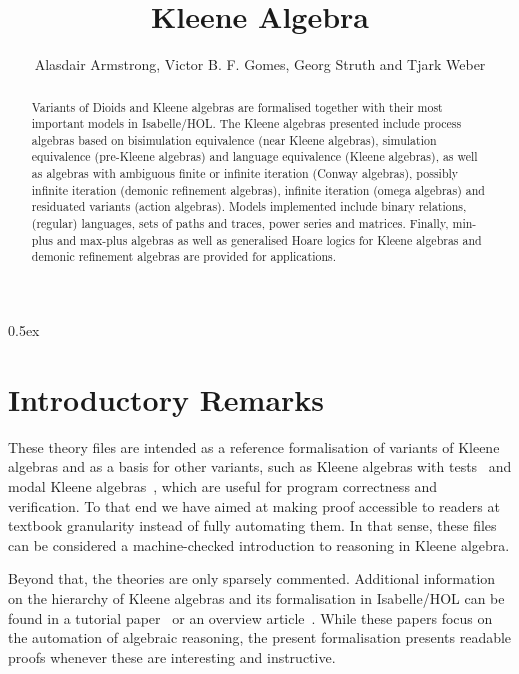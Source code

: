 \documentclass[11pt,a4paper]{article}
\begin{document}
\title{Kleene Algebra}
\author{Alasdair Armstrong, Victor B. F. Gomes, Georg Struth and Tjark Weber}

\maketitle

\begin{abstract}
  Variants of Dioids and Kleene algebras are formalised together with
  their most important models in Isabelle/HOL.  The Kleene algebras
  presented include process algebras based on bisimulation equivalence
  (near Kleene algebras), simulation equivalence (pre-Kleene algebras)
  and language equivalence (Kleene algebras), as well as algebras with
  ambiguous finite or infinite iteration (Conway algebras), possibly
  infinite iteration (demonic refinement algebras), infinite iteration
  (omega algebras) and residuated variants (action algebras).  Models
  implemented include binary relations, (regular) languages, sets of
  paths and traces, power series and matrices.  Finally, min-plus and
  max-plus algebras as well as generalised Hoare logics for Kleene
  algebras and demonic refinement algebras are provided for applications.
\end{abstract}

\tableofcontents

\parindent 0pt\parskip 0.5ex

\section{Introductory Remarks}

These theory files are intended as a reference formalisation of
variants of Kleene algebras and as a basis for other variants, such as
Kleene algebras with tests~\cite{kat} and modal Kleene
algebras~\cite{kad}, which are useful for program correctness and
verification. To that end we have aimed at making proof accessible to
readers at textbook granularity instead of fully automating them.  In
that sense, these files can be considered a machine-checked
introduction to reasoning in Kleene algebra.

Beyond that, the theories are only sparsely commented. Additional
information on the hierarchy of Kleene algebras and its formalisation
in Isabelle/HOL can be found in a tutorial
paper~\cite{fosterstruthweber11tutorial} or an overview
article~\cite{guttmannstruthweber11tarskikleene}. While these papers
focus on the automation of algebraic reasoning, the present
formalisation presents readable proofs whenever these are interesting
and instructive.
\end{document}
